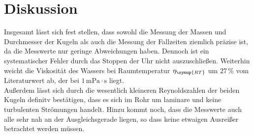 \section{Diskussion}
\label{sec:Diskussion}
Insgesamt lässt sich fest stellen, dass sowohl die Messung der Massen und Durchmesser der Kugeln als auch die Messung der Fallzeiten ziemlich präzise ist,
da die Messwerte nur geringe Abweichungen haben. Dennoch ist ein systematischer Fehler durch das Stoppen der Uhr nicht auszuschließen. Weiterhin weicht
die Viskosität des Wassers bei Raumtemperatur $\eta_{\symup{RT}}$ um $27\,\%$ vom Literaturwert ab, der bei $1\,\unit{\milli\pascal}\cdot \unit{\second}$
\cite{kritreynold} liegt.\\
Außerdem lässt sich durch die wesentlich kleineren Reynoldszahlen der beiden Kugeln definitv bestätigen, dass es sich im Rohr um laminare und keine turbulenten
Strömungen handelt. Hinzu kommt noch, dass die Messwerte auch alle sehr nah an der Ausgleichsgerade liegen, so dass keine etwaigen Ausreißer betrachtet werden müssen.

